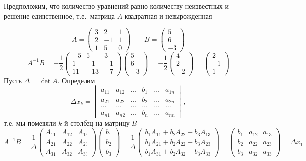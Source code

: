 \documentclass[12pt, a4paper]{article}
\begin{document}
    Предположим, что количество уравнений равно количеству неизвестных и решение единственное, т.е., матрица \( A \) квадратная и невырожденная
    \begin{exmp}
        \[
            A = \begin{pmatrix} 3 & 2 & 1 \\ 2 & -1 & 1 \\ 1 & 5 & 0 \end{pmatrix} \qquad B = \begin{pmatrix} 5 \\ 6 \\-3 \end{pmatrix} 
        \] 
        \[
            A^{-1}B = -\frac{1}{2}\begin{pmatrix} -5 & 5 & 3 \\ 1 & -1 & -1 \\ 11 & -13 & -7 \end{pmatrix} \begin{pmatrix} 5 \\ 6 \\ -3 \end{pmatrix} = -\frac{1}{2} \begin{pmatrix} 4 \\ 2\\ -2 \end{pmatrix} = \begin{pmatrix} 2 \\ -1 \\ 1 \end{pmatrix} 
            \]Пусть \( \Delta = \det A \). Определим \[
            \Delta x_{k} = \begin{vmatrix} a_{11} & a_{12} & \ldots & b_{1} & \ldots & a_{1n}\\ a_{21} & a_{22} & \ldots & b_{2} & \ldots & a_{2n} \\ \ldots  & \ldots  & \ldots & \ldots & \ldots & \ldots  \\ a_{n1} & a_{n 2} & \ldots  & b_{n} & \ldots & a_{nn} \end{vmatrix},
        \]т.е. мы поменяли \( k \)-й столбец на матрицу \( B \) \[
            A^{-1}B = \frac{1}{\Delta}\begin{pmatrix} A_{11} & A_{12} & A_{13} \\ A_{21} & A_{22} & A_{23} \\ A_{31} & A_{32} & A_{33} \end{pmatrix} \begin{pmatrix} b_{1} \\ b_{2} \\ b_{3} \end{pmatrix}  = \frac{1}{\Delta}\begin{pmatrix} b_{1}A_{11} + b_{2}A_{22} + b_{3}A_{13} \\ b_{1}A_{21} + b_{2}A_{22} + b_{3}A_{23} \\ b_{1}A_{31} + b_{2}A_{32} + b_{3}A_{33} \end{pmatrix} = \begin{pmatrix} b_{1} & a_{12} & a_{13} \\ b_{2} & a_{22} & a_{23} \\ b_{3} & a_{32} & a_{33} \end{pmatrix} = \Delta x_{1}
\]
\end{exmp}
\end{document}
